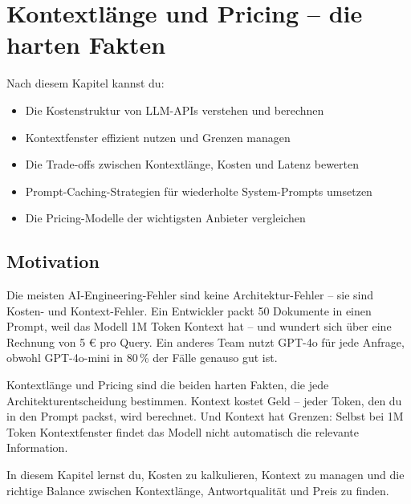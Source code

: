 \chapter{Kontextlänge und Pricing -- die harten Fakten}

\label{chap:kontext_pricing}

\begin{lernziele}
Nach diesem Kapitel kannst du:
\begin{itemize}
    \item Die Kostenstruktur von LLM-APIs verstehen und berechnen
    \item Kontextfenster effizient nutzen und Grenzen managen
    \item Die Trade-offs zwischen Kontextlänge, Kosten und Latenz bewerten
    \item Prompt-Caching-Strategien für wiederholte System-Prompts umsetzen
    \item Die Pricing-Modelle der wichtigsten Anbieter vergleichen
\end{itemize}
\end{lernziele}

\section{Motivation}

Die meisten AI-Engineering-Fehler sind keine Architektur-Fehler -- sie sind
Kosten- und Kontext-Fehler. Ein Entwickler packt 50 Dokumente in einen
Prompt, weil das Modell 1M Token Kontext hat -- und wundert sich über eine
Rechnung von 5 € pro Query. Ein anderes Team nutzt GPT-4o für jede Anfrage,
obwohl GPT-4o-mini in 80\,\% der Fälle genauso gut ist.

Kontextlänge und Pricing sind die beiden harten Fakten, die jede
Architekturentscheidung bestimmen. Kontext kostet Geld -- jeder Token,
den du in den Prompt packst, wird berechnet. Und Kontext hat Grenzen:
Selbst bei 1M Token Kontextfenster findet das Modell nicht automatisch
die relevante Information.

In diesem Kapitel lernst du, Kosten zu kalkulieren, Kontext zu managen
und die richtige Balance zwischen Kontextlänge, Antwortqualität und
Preis zu finden.


